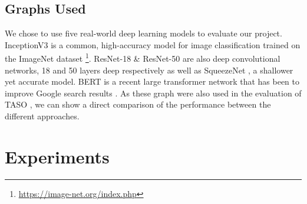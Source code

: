 \subsection{Graphs Used}
\label{sec:eval:subsec:graphsused}

\begin{table}[htbp]
  \centering
  \caption[Properties of evaluation graphs]{Properties of the five evaluation graphs used in the experiments contained in this chapter. We differentiate the total number of layers in a network from the number of unique layers used in composing the network to provide a more accurate representation of its complexity.}
  \label{table:eval:graph-props}
\end{table}

We chose to use five real-world deep learning models to evaluate our project. InceptionV3 \cite{szegedy2015rethinking} is a common, high-accuracy model for image classification trained on the ImageNet dataset \footnote{\url{https://image-net.org/index.php}}. ResNet-18 \& ResNet-50 \cite{he2015deep} are also deep convolutional networks, 18 and 50 layers deep respectively as well as SqueezeNet \cite{iandola2016squeezenet}, a shallower yet accurate model. BERT \cite{devlin2019bert} is a recent large transformer network that has been to improve Google search results \cite{nayak2019}. As these graph were also used in the evaluation of TASO \cite{jia2019taso}, we can show a direct comparison of the performance between the different approaches.

\section{Experiments}

